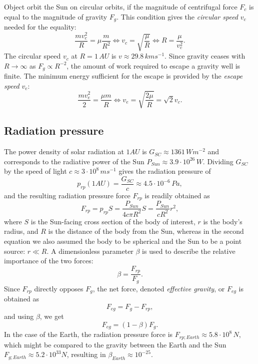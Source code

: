 Object orbit the Sun on circular orbits, if the magnitude of centrifugal force $F_c$ is equal to the magnitude of gravity $F_g$. This condition gives the \textit{circular speed} $v_c$ needed for the equality: 
\begin{equation}
    \frac{m v_c^2}{R} = \mu \frac{m}{R^2} \Leftrightarrow v_c = \sqrt{\frac{\mu}{R}} \Leftrightarrow R = \frac{\mu}{v_c^2}.
    \label{eq:circular_speed}
\end{equation}
The circular speed $v_c$ at $R = 1 \, \si{AU}$ is $v \approx 29.8 \, \si{km s^{-1}}$. Since gravity ceases with $R \to \infty$ as $F_g \propto R^{-2}$, the amount of work required to escape a gravity well is finite. The minimum energy sufficient for the escape is provided by the \textit{escape speed} $v_e$: 
\begin{equation}
    \frac{m v_e^2}{2} = \frac{\mu m}{R} \Leftrightarrow v_e = \sqrt{\frac{2 \mu}{R}} = \sqrt{2} v_c.
    \label{eq:escape_speed}
\end{equation}

\subsection{Radiation pressure}

The power density of solar radiation at $1 \si{AU}$ is $G_{SC} \approx 1361 \, \si{W m^{-2}}$ \citep{kopp2011new} and corresponds to the radiative power of the Sun $P_{Sun} \approx 3.9 \cdot 10^{26} \, \si{W}$. Dividing $G_{SC}$ by the speed of light $c \approx 3\cdot10^8 \, \si{m s^{-1}}$ gives the radiation pressure of
\begin{equation}
    p_{rp}(1 \si{AU}) = \frac{G_{SC}}{c} \approx 4.5 \cdot 10^{-6} \, \si{Pa},
    \label{eq:radiation_pressure}
\end{equation}
and the resulting radiation pressure force $F_{rp}$ is readily obtained as
\begin{equation}
    F_{rp} = p_{rp} S = \frac{P_{Sun}}{4 c \pi R^2} S = \frac{P_{Sun}}{cR^2} r^2, \label{eq:radiation_pressure_force}
\end{equation}
where $S$ is the Sun-facing cross section of the body of interest, $r$ is the body's radius, and $R$ is the distance of the body from the Sun, whereas in the second equation we also assumed the body to be spherical and the Sun to be a point source: $r \ll R$. A dimensionless parameter $\beta$ is used to describe the relative importance of the two forces:
\begin{equation}
    \beta = \frac{F_{rp}}{F_g}.
\end{equation}
Since $F_{rp}$ directly opposes $F_g$, the net force, denoted \textit{effective gravity}, or $F_{eg}$ is obtained as
\begin{equation}
    F_{eg} = F_g - F_{rp},
\end{equation}
and using $\beta$, we get
\begin{equation}
    F_{eg} = (1-\beta) F_g.
\end{equation}
In the case of the Earth, the radiation pressure force is $F_{rp;Earth} \approx 5.8 \cdot 10^8 \, \si{N}$, which might be compared to the gravity between the Earth and the Sun $F_{g;Earth} \approx 5.2 \cdot 10^{33} \si{N}$, resulting in $\beta_{Earth} \approx 10^{-25}$. 

